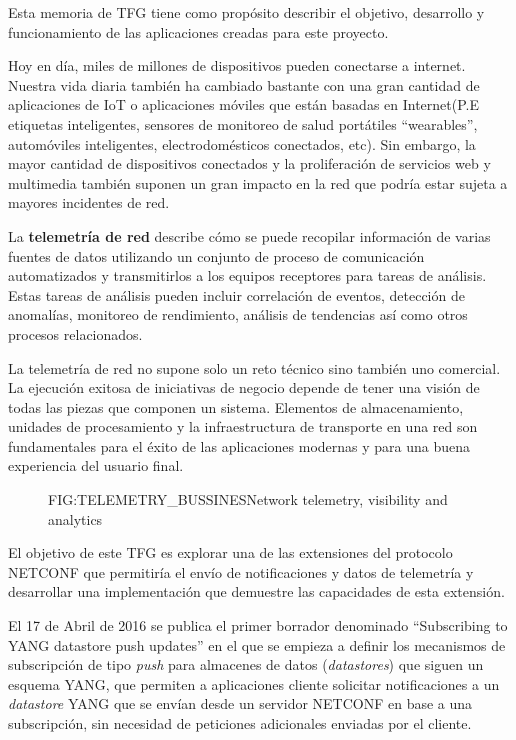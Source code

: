 Esta memoria de \ac{TFG} tiene como propósito describir el objetivo, desarrollo y funcionamiento de las aplicaciones creadas para este proyecto.

Hoy en día, miles de millones de dispositivos pueden conectarse a internet. Nuestra vida diaria también ha cambiado bastante con una gran cantidad de aplicaciones de IoT o aplicaciones móviles que están basadas en Internet(P.E etiquetas inteligentes, sensores de monitoreo de salud portátiles ``wearables'', automóviles inteligentes, electrodomésticos conectados, etc). Sin embargo, la mayor cantidad de dispositivos conectados y la proliferación de servicios web y multimedia también suponen un gran impacto en la red que podría estar sujeta a mayores incidentes de red. 

La \textbf{telemetría de red} describe cómo se puede recopilar información de varias fuentes de datos utilizando un conjunto de proceso de comunicación automatizados y transmitirlos a los equipos receptores para tareas de análisis. Estas tareas de análisis pueden incluir correlación de eventos, detección de anomalías, monitoreo de rendimiento, análisis de tendencias así como otros procesos relacionados. 

La telemetría de red no supone solo un reto técnico sino también uno comercial. La ejecución exitosa de iniciativas de negocio depende de tener una visión de todas las piezas que componen un sistema. Elementos de almacenamiento, unidades de procesamiento y la infraestructura de transporte en una red son fundamentales para el éxito de las aplicaciones modernas y para una buena experiencia del usuario final. 

\begin{figure}[Network telemetry, visibility and analytics]{FIG:TELEMETRY_BUSSINES}{Network telemetry, visibility and analytics}
\end{figure}

El objetivo de este \ac{TFG} es explorar una de las extensiones del protocolo \ac{NETCONF} que permitiría el envío de notificaciones y datos de telemetría y desarrollar una implementación que demuestre las capacidades de esta extensión.

El 17 de Abril de 2016 se publica el primer borrador denominado  ``Subscribing to YANG datastore push updates'' en el que se empieza a definir los mecanismos de subscripción de tipo \textit{push} para almacenes de datos (\textit{datastores}) que siguen un esquema YANG, que permiten a aplicaciones cliente solicitar notificaciones a un \textit{datastore} YANG que se envían desde un servidor NETCONF en base a una subscripción, sin necesidad de peticiones adicionales enviadas por el cliente\cite{draft-ietf-netconf-yang-push-00}.

